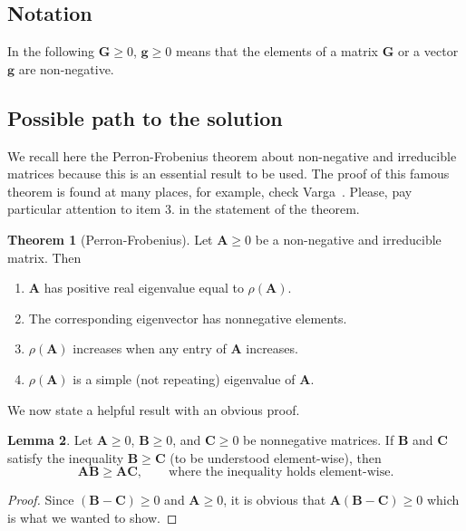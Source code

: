 \documentclass[12pt]{amsart}
\theoremstyle{definition}
\newtheorem{theorem}{Theorem}[section]
\newtheorem{lemma}[theorem]{Lemma}
\begin{document}
\subsection{Notation} 
In the following $\bm G\ge 0$, $\bm g\ge 0$ means that the elements of a matrix $\bm G$ or a vector $\bm g$ are non-negative. 

\subsection{Possible path to the solution} We recall here the Perron-Frobenius theorem about non-negative and irreducible matrices because this is an essential result to be used. The proof of this famous theorem is found at many places, for example, check Varga~\cite[Theorem 2.7]{2000Varga-aa}. Please, pay particular attention to item 3. in the statement of the theorem. 
\begin{theorem}[Perron-Frobenius]
  Let $\bm A\geq 0$ be a non-negative and irreducible matrix. Then
  \begin{enumerate}
  \item $\bm A$ has positive real eigenvalue equal to $\rho(\bm A)$.
  \item The corresponding eigenvector has nonnegative elements.
  \item $\rho(\bm A)$ increases when any entry of $\bm A$ increases.
  \item $\rho(\bm A)$ is a simple (not repeating) eigenvalue of $\bm A$.
  \end{enumerate}
\end{theorem}

We now state a helpful result with an obvious proof. 
\begin{lemma}\label{l-1}
Let $\bm A\ge 0$, $\bm B\ge 0$, and $\bm C\ge 0$ be nonnegative matrices. If $\bm B$ and $\bm C$  satisfy the inequality $\bm B \ge \bm C$ (to be understood element-wise),  then 
\begin{equation}
\bm{A}\bm B\ge \bm{A}\bm C,\qquad\mbox{where the inequality holds element-wise.}
\end{equation}
\end{lemma} 
\begin{proof} Since $(\bm B - \bm C)\ge 0$ and $\bm A\ge 0$, it is obvious that $\bm A(\bm B - \bm C)\ge 0$ which is what we wanted to show. 
\end{proof}
\end{document}
